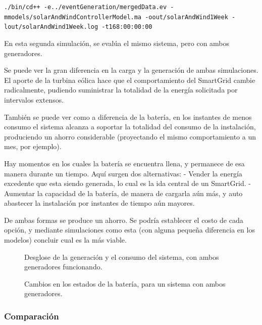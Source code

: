 \texttt{./bin/cd++\ -e../eventGeneration/mergedData.ev\ -mmodels/solarAndWindControllerModel.ma\ -oout/solarAndWind1Week\ -lout/solarAndWind1Week.log\ -t168:00:00:00}

    En esta segunda simulación, se evalúa el mismo sistema, pero con ambos
generadores.

Se puede ver la gran diferencia en la carga y la generación de ambas
simulaciones. El aporte de la turbina eólica hace que el comportamiento
del SmartGrid cambie radicalmente, pudiendo suministrar la totalidad de la
energía solicitada por intervalos extensos.

También se puede ver como a diferencia de la batería, en los instantes
de menos consumo el sistema alcanza a soportar la totalidad del consumo
de la instalación, produciendo un ahorro considerable (proyectando el
mismo comportamiento a un mes, por ejemplo).

Hay momentos en los cuales la batería se encuentra llena, y permanece de
esa manera durante un tiempo. Aquí surgen dos alternativas: - Vender la
energía excedente que esta siendo generada, lo cual es la ida central de
un SmartGrid. - Aumentar la capacidad de la batería, de manera de
cargarla aún más, y auto abastecer la instalación por instantes de tiempo
aún mayores.

De ambas formas se produce un ahorro. Se podría establecer el costo de
cada opción, y mediante simulaciones como esta (con alguna pequeña
diferencia en los modelos) concluir cual es la más viable.

\begin{figure}
    \begin{center}
    \end{center}
    \caption{Desglose de la generación y el consumo del sistema, con ambos generadores funcionando.}
\end{figure}
    
\begin{figure}
    \begin{center}
    \end{center}
    \caption{Cambios en los estados de la batería, para un sistema con ambos generadores.}
\end{figure}
    
\hypertarget{quuxe9-generador-vale-muxe1s}{%
\subsubsection{Comparación}\label{quuxe9-generador-vale-muxe1s}}

